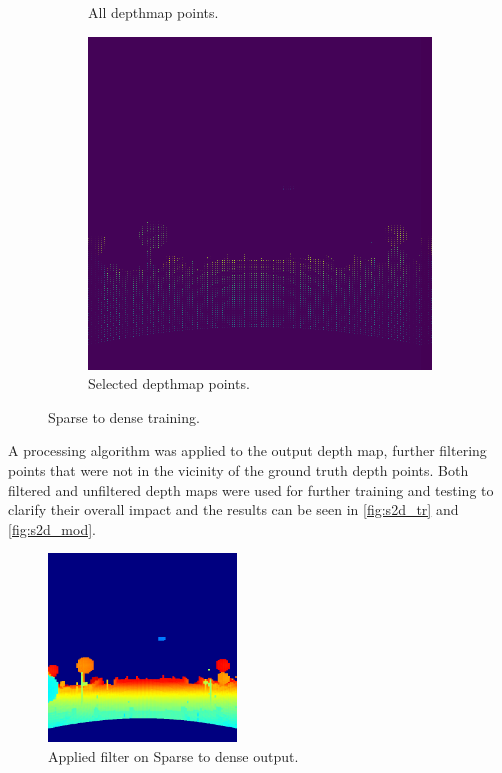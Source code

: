 \documentclass[twoside]{ctuthesis}
\theoremstyle{plain}
\theoremstyle{definition}
\theoremstyle{note}
\begin{document}
\begin{figure}
\begin{subfigure}[b]{0.4\textwidth}
		\caption{All depthmap points.}
	\end{subfigure}
	\hfill
	\begin{subfigure}[b]{0.4\textwidth}
		\centering
		\includegraphics[width=\textwidth]{s2d_select.png}
		\caption{Selected depthmap points.}
	\end{subfigure}
	\caption{Sparse to dense training.}
	\label{fig:s2d_tr}
\end{figure}
A processing algorithm was applied to the output depth map, further filtering points that were not in the vicinity of the ground truth depth points. Both filtered and unfiltered depth maps were used for further training and testing to clarify their overall impact and the results can be seen in \autoref{fig:s2d_tr} and \autoref{fig:s2d_mod}.
\begin{figure}
	\centering
	\includegraphics[width=5cm]{sparse2dense_filter.png}
	\caption{Applied filter on Sparse to dense output.}
	\label{fig:s2d_mod}
\end{figure}
\end{document}
